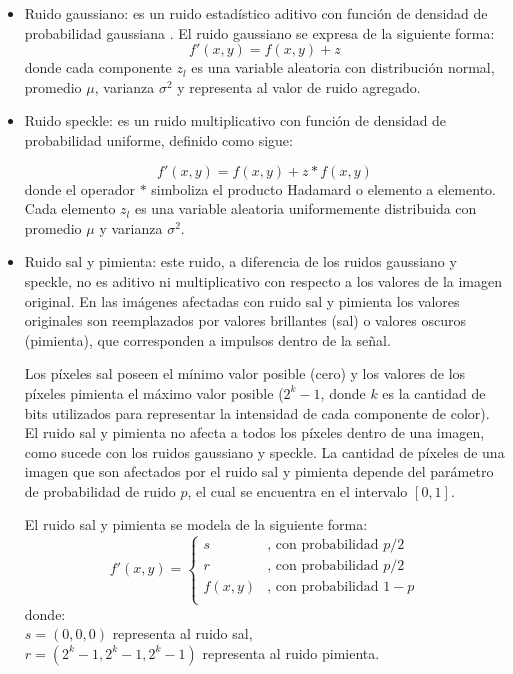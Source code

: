 \begin{itemize}
	
\item{Ruido gaussiano:}
es un ruido estadístico aditivo con función de densidad de probabilidad gaussiana \cite{davenport1958random}. El ruido gaussiano se expresa de la siguiente forma:
\begin{equation}
\label{eq:gaussian_noise}
f'(x, y) = f(x, y) + z
\end{equation}
donde cada componente $z_l$ es una variable aleatoria con distribución normal, promedio $\mu$, varianza $\sigma^2$ y representa al valor de ruido agregado.

\item{Ruido speckle:}
es un ruido multiplicativo con función de densidad de probabilidad uniforme, definido como sigue: 

\begin{equation}
\label{eq:speckle}
f'(x, y) = f(x, y) + z \ast f(x, y)  
\end{equation}
donde el operador $\ast$ simboliza el producto Hadamard o elemento a elemento. Cada elemento $z_l$ es una variable aleatoria uniformemente distribuida con promedio $\mu$ y varianza $\sigma^2$.

\item{Ruido sal y pimienta:}
este ruido, a diferencia de los ruidos gaussiano y speckle, no es aditivo ni multiplicativo con respecto a los valores de la imagen original. En las imágenes afectadas con ruido sal y pimienta los valores originales son reemplazados por valores brillantes (sal) o valores oscuros (pimienta), que corresponden a impulsos dentro de la señal. 

Los píxeles sal poseen el mínimo valor posible (cero) y los valores de los píxeles pimienta el máximo valor posible ($2^k - 1$, donde $k$ es la cantidad de bits utilizados para representar la intensidad de cada componente de color). El ruido sal y pimienta no afecta a todos los píxeles dentro de una imagen, como sucede con los ruidos gaussiano y speckle. La cantidad de píxeles de una imagen que son afectados por el ruido sal y pimienta depende del parámetro de probabilidad de ruido $p$, el cual se encuentra en el intervalo $[0, 1]$.

El ruido sal y pimienta se modela de la siguiente forma:
\begin{equation}
\label{eq:salt_and_pepper}
f'(x, y)=\left\{ \begin{array}{cl}
s & \text{, con probabilidad } p/2 \\
r & \text{, con probabilidad } p/2 \\
f(x, y) & \text{, con probabilidad } 1 - p \\
\end{array}\right.
\end{equation}
donde:\\ $s = (0, 0, 0)$ representa al ruido sal,\\ $r = (2^k - 1, 2^k - 1, 2^k - 1 )$ representa al ruido pimienta.


\end{itemize}



